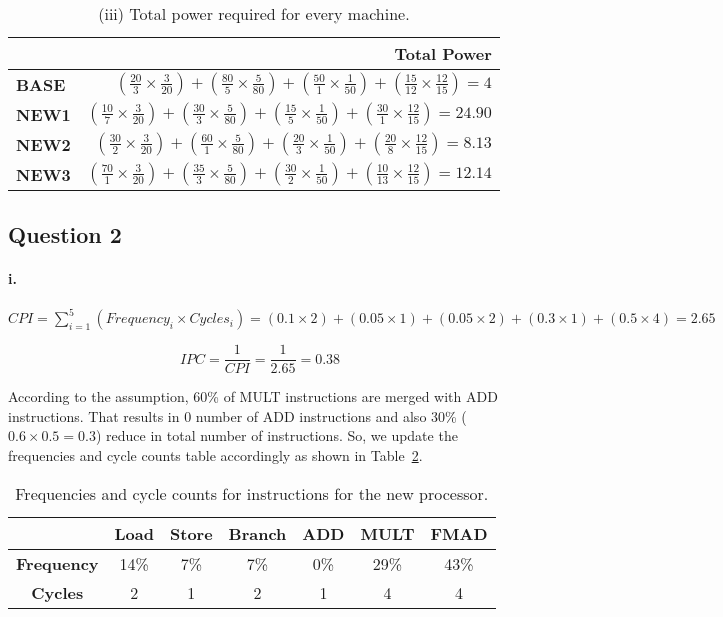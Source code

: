 \documentclass[12pt]{article}
\newcommand{\q}[1]{\subsection*{Question {#1}}}
\renewcommand{\part}[1]{\paragraph*{{#1}.}}
\begin{document}
\begin{table}[h]
\center
\begin{tabular}{|l|r|}
	\hline
	 & \textbf{Total Power} \\
	\hline
	\textbf{BASE} & $(\frac{20}{3} \times \frac{3}{20}) + (\frac{80}{5} \times 
	\frac{5}{80}) + (\frac{50}{1} \times \frac{1}{50}) + (\frac{15}{12} \times 
	\frac{12}{15})  = 4$  \\
	\hline
	\textbf{NEW1} & $(\frac{10}{7} \times \frac{3}{20}) + (\frac{30}{3} \times 
	\frac{5}{80}) + (\frac{15}{5} \times \frac{1}{50}) + 
	(\frac{30}{1} \times \frac{12}{15}) = 24.90$ \\
	\hline
	\textbf{NEW2} & $(\frac{30}{2} \times \frac{3}{20}) + (\frac{60}{1} \times 
	\frac{5}{80}) + (\frac{20}{3} \times \frac{1}{50}) + 
	(\frac{20}{8} \times \frac{12}{15}) = 8.13$ \\
	\hline
	\textbf{NEW3} & $(\frac{70}{1} \times \frac{3}{20}) + (\frac{35}{3} \times 
	\frac{5}{80}) + (\frac{30}{2} \times \frac{1}{50}) + 
	(\frac{10}{13} \times \frac{12}{15}) = 12.14$ \\
	\hline
\end{tabular}
\caption{(iii) Total power required for every machine.}
\label{tbl:wpwr}
\end{table}

\q{2}
\part{i} 
$
CPI = \sum \limits_{i=1}^{5} (Frequency_i \times Cycles_i) = 
(0.1 \times 2) + (0.05 \times 1) + (0.05 \times 2) + (0.3 \times 1) + 
(0.5 \times 4) = 2.65
$

$$
IPC = \frac{1}{CPI} = \frac{1}{2.65} = 0.38
$$

According to the assumption, 60\% of MULT instructions are merged with ADD 
instructions. That results in 0 number of ADD instructions and also 30\% 
($0.6 \times 0.5 = 0.3$) reduce in total number of instructions. So, we update 
the frequencies and cycle counts table accordingly as shown in 
Table~\ref{tbl:newfreq}.

\begin{table}[h]
\center
\begin{tabular}{|c|c|c|c|c|c|c|}
	\hline
	 & \textbf{Load} & \textbf{Store} & \textbf{Branch} & \textbf{ADD} & 
	 \textbf{MULT} & \textbf{FMAD} \\
	\hline
	\textbf{Frequency} & 14\% & 7\% & 7\% & 0\% & 29\% & 43\% \\
	\hline
	\textbf{Cycles} & 2 & 1 & 2 & 1 & 4 & 4 \\
	\hline
\end{tabular}
\caption{Frequencies and cycle counts for instructions for the new processor.}
\label{tbl:newfreq}
\end{table}
\end{document}

